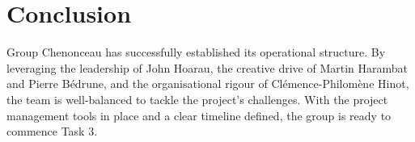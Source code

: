 \section{Conclusion}

Group Chenonceau has successfully established its operational structure. By leveraging the leadership of John Hoarau, the creative drive of Martin Harambat and Pierre Bédrune, and the organisational rigour of Clémence-Philomène Hinot, the team is well-balanced to tackle the project's challenges. With the project management tools in place and a clear timeline defined, the group is ready to commence Task 3.